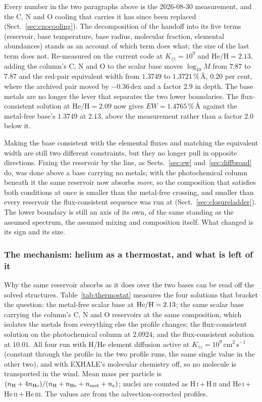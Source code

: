 \documentclass[english,a4paper]{my_memo}
\begin{document}
\medskip
\noindent Every number in the two paragraphs above is the 2026-08-30
measurement, and the C, N and O cooling that carries it has since been
replaced (Sect.~\ref{sec:cnocooling}). The decomposition of the handoff into
its five terms (reservoir, base temperature, base radius, molecular fraction,
elemental abundances) stands as an account of which term does what; the size
of the last term does not. Re-measured on the current code at
$K_{zz} = 10^{9}$ and $\mathrm{He/H} = 2.13$, adding the column's C, N and O
to the scalar base moves $\log_{10}\dot M$ from $7.87$ to $7.87$ and the
red-pair equivalent width from $1.3749$ to $1.3721$\,\%\,\AA{}, $0.20$ per
cent, where the archived pair moved by $-0.36$\,dex and a factor $2.9$ in
depth. The base metals are no longer the lever that separates the two lower
boundaries. The flux-consistent solution at $\mathrm{He/H} = 2.09$ now gives
$EW = 1.4765$\,\%\,\AA{} against the metal-free base's $1.3749$ at $2.13$,
above the measurement rather than a factor $2.0$ below it.

Making the base consistent with the elemental fluxes and matching the
equivalent width are still two different constraints, but they no longer pull
in opposite directions. Fixing the reservoir by the line, as
Sects.~\ref{sec:ew} and~\ref{sec:diffbroad} do, was done above a base
carrying no metals; with the photochemical column beneath it the same
reservoir now absorbs \emph{more}, so the composition that satisfies both
conditions at once is smaller than the metal-free crossing, and smaller than
every reservoir the flux-consistent sequence was run at
(Sect.~\ref{sec:closureladder}). The lower boundary is still an axis of its
own, of the same standing as the assumed spectrum, the assumed mixing and
composition itself. What changed is its sign and its size.

\subsubsection*{The mechanism: helium as a thermostat, and what is left of it}

Why the same reservoir absorbs as it does over the two bases can be read off
the solved structures. Table~\ref{tab:thermostat} measures the four solutions
that bracket the question: the metal-free scalar base at ${\rm He/H} = 2.13$;
the same scalar base carrying the column's C, N and O reservoirs at the same
composition, which isolates the metals from everything else the profile
changes; the flux-consistent solution on the photochemical column at
$2.0924$; and the flux-consistent solution at $10.01$. All four run with H/He
element diffusion active at $K_{zz} = 10^{9}$\,cm$^{2}$\,s$^{-1}$ (constant
through the profile in the two profile runs, the same single value in the
other two), and with EXHALE's molecular chemistry off, so no molecule is
transported in the wind. Mean mass per particle is
$(n_{\rm H} + 4n_{\rm He})/(n_{\rm H} + n_{\rm He} + n_{\rm met} + n_e)$;
nuclei are counted as H\,\textsc{i}\,$+$\,H\,\textsc{ii} and
He\,\textsc{i}\,$+$\,He\,\textsc{ii}\,$+$\,He\,\textsc{iii}. The values are
from the advection-corrected profiles.
\end{document}
